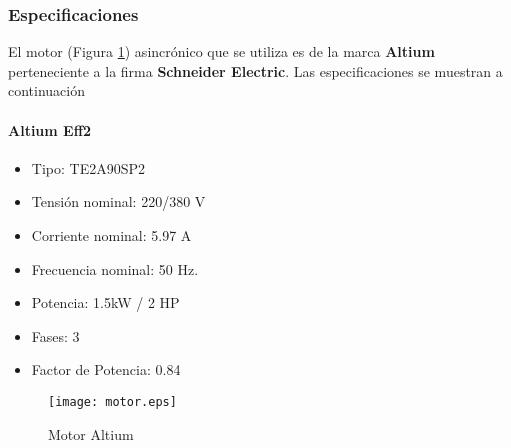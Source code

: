 
\begin{center}
\end{center}
		
	

\subsubsection{Especificaciones}

	El motor (Figura \ref{fig:motor}) asincrónico que se utiliza es de la marca \textbf{Altium} perteneciente a la firma \textbf{Schneider Electric}. Las especificaciones se muestran a continuación \\
	\paragraph*{Altium Eff2}
	\begin{itemize}
		\item 	Tipo: TE2A90SP2
		\item   Tensión nominal: 220/380 V
		\item 	Corriente nominal: 5.97 A 
		\item	Frecuencia nominal:  50 Hz.
		\item 	Potencia: 1.5kW / 2 HP
		\item 	Fases: 3
		\item   Factor de Potencia: 0.84
	\end{itemize}
	\newpage
	\begin{figure}[h!]
		\centering
		\texttt{[image: motor.eps]}
		\caption{Motor Altium}
		\label{fig:motor}
	\end{figure}
	\newpage